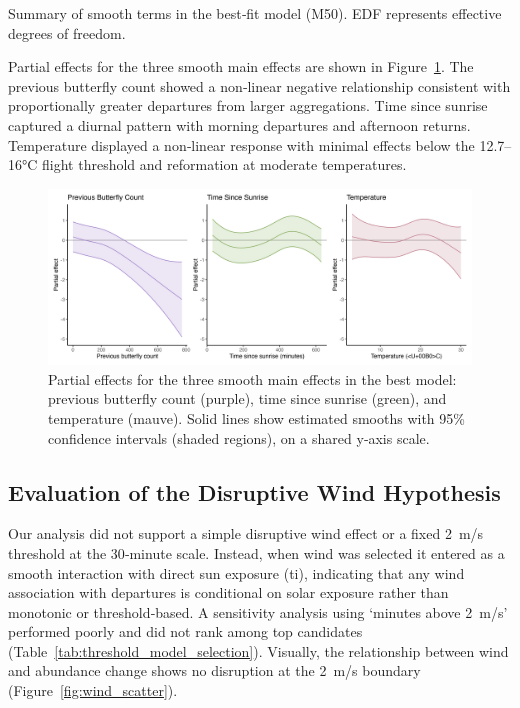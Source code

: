 \begin{table}[htbp]
\centering
\caption{Summary of smooth terms in the best‑fit model (M50). EDF represents effective degrees of freedom.}\label{tab:smooth_terms}

\end{table}

Partial effects for the three smooth main effects are shown in Figure~\ref{fig:partial_effects}. The previous butterfly count showed a non‑linear negative relationship consistent with proportionally greater departures from larger aggregations. Time since sunrise captured a diurnal pattern with morning departures and afternoon returns. Temperature displayed a non‑linear response with minimal effects below the 12.7–16°C flight threshold and reformation at moderate temperatures.

\begin{figure}[htbp]
\centering
\includegraphics[width=\textwidth]{figures/results/combined_partial_effects_1x3_final.png}
\caption{Partial effects for the three smooth main effects in the best model: previous butterfly count (purple), time since sunrise (green), and temperature (mauve). Solid lines show estimated smooths with 95\% confidence intervals (shaded regions), on a shared y‑axis scale.}\label{fig:partial_effects}
\end{figure}

\subsection{Evaluation of the Disruptive Wind Hypothesis}

Our analysis did not support a simple disruptive wind effect or a fixed 2~m/s threshold at the 30‑minute scale. Instead, when wind was selected it entered as a smooth interaction with direct sun exposure (ti), indicating that any wind association with departures is conditional on solar exposure rather than monotonic or threshold‑based. A sensitivity analysis using ‘minutes above 2~m/s’ performed poorly and did not rank among top candidates (Table~\ref{tab:threshold_model_selection}). Visually, the relationship between wind and abundance change shows no disruption at the 2~m/s boundary (Figure~\ref{fig:wind_scatter}).

